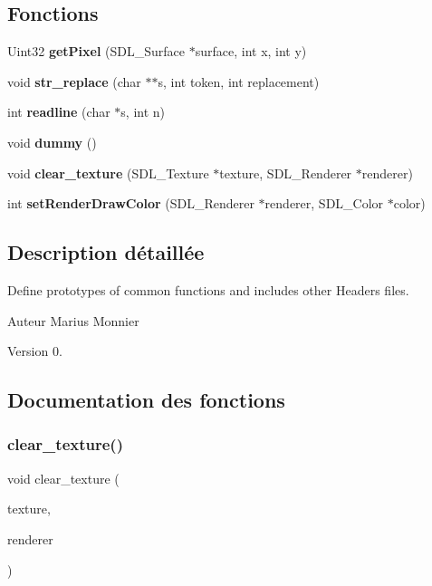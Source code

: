 \subsection*{Fonctions}
\begin{DoxyCompactItemize}
\item 
\mbox{\label{fonctions_8h_a48c6792c544a90cd7a552667ce5bba4a}} 
Uint32 {\bfseries get\+Pixel} (S\+D\+L\+\_\+\+Surface $\ast$surface, int x, int y)
\item 
void \textbf{ str\+\_\+replace} (char $\ast$$\ast$s, int token, int replacement)
\item 
int \textbf{ readline} (char $\ast$s, int n)
\item 
\mbox{\label{fonctions_8h_a100d09f9a57d44745299c28c63c98745}} 
void {\bfseries dummy} ()
\item 
void \textbf{ clear\+\_\+texture} (S\+D\+L\+\_\+\+Texture $\ast$texture, S\+D\+L\+\_\+\+Renderer $\ast$renderer)
\item 
int \textbf{ set\+Render\+Draw\+Color} (S\+D\+L\+\_\+\+Renderer $\ast$renderer, S\+D\+L\+\_\+\+Color $\ast$color)
\end{DoxyCompactItemize}


\subsection{Description détaillée}
Define prototypes of common functions and includes other Headers files. 

\begin{DoxyAuthor}{Auteur}
Marius Monnier 
\end{DoxyAuthor}
\begin{DoxyVersion}{Version}
0. 
\end{DoxyVersion}


\subsection{Documentation des fonctions}
\mbox{\label{fonctions_8h_ab0852adabab2829b722da4fc549ac6a9}} 
\subsubsection{clear\+\_\+texture()}
{\footnotesize\ttfamily void clear\+\_\+texture (\begin{DoxyParamCaption}\item[{S\+D\+L\+\_\+\+Texture $\ast$}]{texture,  }\item[{S\+D\+L\+\_\+\+Renderer $\ast$}]{renderer }\end{DoxyParamCaption})}




